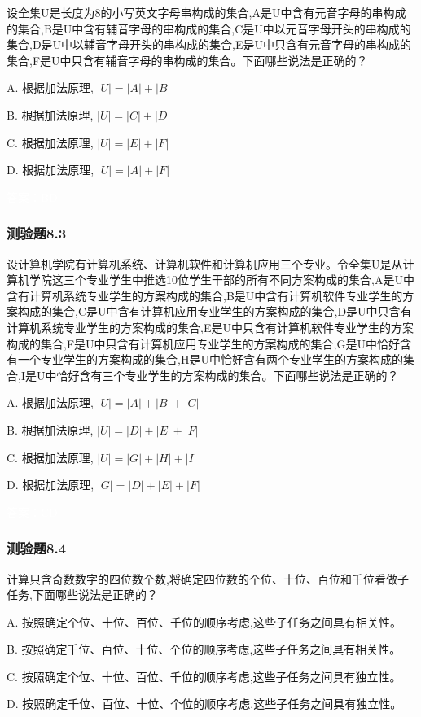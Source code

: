 \documentclass[UTF8, heading=true]{ctexart}
\begin{document}
设全集U是长度为8的小写英文字母串构成的集合,A是U中含有元音字母的串构成的集合,B是U中含有辅音字母的串构成的集合,C是U中以元音字母开头的串构成的集合,D是U中以辅音字母开头的串构成的集合,E是U中只含有元音字母的串构成的集合,F是U中只含有辅音字母的串构成的集合。下面哪些说法是正确的？

A. 根据加法原理, $|U|=|A|+|B|$

B. 根据加法原理, $|U|=|C|+|D|$

C. 根据加法原理, $|U|=|E|+|F|$

D. 根据加法原理, $|U|=|A|+|F|$

\textcolor{white}{答案：BD}

\subsubsection{测验题8.3}

设计算机学院有计算机系统、计算机软件和计算机应用三个专业。令全集U是从计算机学院这三个专业学生中推选10位学生干部的所有不同方案构成的集合,A是U中含有计算机系统专业学生的方案构成的集合,B是U中含有计算机软件专业学生的方案构成的集合,C是U中含有计算机应用专业学生的方案构成的集合,D是U中只含有计算机系统专业学生的方案构成的集合,E是U中只含有计算机软件专业学生的方案构成的集合,F是U中只含有计算机应用专业学生的方案构成的集合,G是U中恰好含有一个专业学生的方案构成的集合,H是U中恰好含有两个专业学生的方案构成的集合,I是U中恰好含有三个专业学生的方案构成的集合。下面哪些说法是正确的？

A. 根据加法原理, $|U|=|A|+|B|+|C|$

B. 根据加法原理, $|U|=|D|+|E|+|F|$

C. 根据加法原理, $|U|=|G|+|H|+|I|$

D. 根据加法原理, $|G|=|D|+|E|+|F|$

\textcolor{white}{答案：CD}
\subsubsection{测验题8.4}
计算只含奇数数字的四位数个数,将确定四位数的个位、十位、百位和千位看做子任务,下面哪些说法是正确的？

A. 按照确定个位、十位、百位、千位的顺序考虑,这些子任务之间具有相关性。

B. 按照确定千位、百位、十位、个位的顺序考虑,这些子任务之间具有相关性。

C. 按照确定个位、十位、百位、千位的顺序考虑,这些子任务之间具有独立性。

D. 按照确定千位、百位、十位、个位的顺序考虑,这些子任务之间具有独立性。
\end{document}
